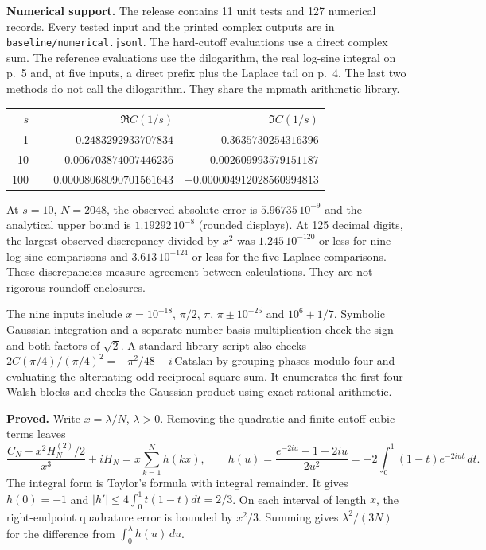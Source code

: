 \newpage
{}
\textbf{Numerical support.} The release contains 11 unit tests and 127 numerical records. Every tested input and the printed complex outputs are in \texttt{baseline/numerical.jsonl}. The hard-cutoff evaluations use a direct complex sum. The reference evaluations use the dilogarithm, the real log-sine integral on p.~5 and, at five inputs, a direct prefix plus the Laplace tail on p.~4. The last two methods do not call the dilogarithm. They share the mpmath arithmetic library.

\begin{center}
\begin{tabular}{@{}r@{\qquad}r@{\qquad}r@{}}
$s$ & $\Re C(1/s)$ & $\Im C(1/s)$\\ \hline
1   & $-0.2483292933707834$ & $-0.3635730254316396$\\
10  & $\phantom{-}0.006703874007446236$ & $-0.002609993579151187$\\
100 & $\phantom{-}0.00008068090701561643$ & $-0.000004912028560994813$
\end{tabular}
\end{center}
At $s=10$, $N=2048$, the observed absolute error is $5.96735\,10^{-9}$ and the analytical upper bound is $1.19292\,10^{-8}$ (rounded displays). At 125 decimal digits, the largest observed discrepancy divided by $x^2$ was $1.245\,10^{-120}$ or less for nine log-sine comparisons and $3.613\,10^{-124}$ or less for the five Laplace comparisons. These discrepancies measure agreement between calculations. They are not rigorous roundoff enclosures.

The nine inputs include $x=10^{-18}$, $\pi/2$, $\pi$, $\pi\pm10^{-25}$ and $10^6+1/7$. Symbolic Gaussian integration and a separate number-basis multiplication check the sign and both factors of $\sqrt{2}$. A standard-library script also checks $2C(\pi/4)/(\pi/4)^2=-\pi^2/48-i\,\mathrm{Catalan}$ by grouping phases modulo four and evaluating the alternating odd reciprocal-square sum. It enumerates the first four Walsh blocks and checks the Gaussian product using exact rational arithmetic.

\textbf{Proved.} Write $x=\lambda/N$, $\lambda>0$. Removing the quadratic and finite-cutoff cubic terms leaves
\[
 \frac{C_N-x^2H_N^{(2)}/2}{x^3}+iH_N
   =x\sum_{k=1}^N h(kx),\qquad
 h(u)=\frac{e^{-2iu}-1+2iu}{2u^2}
     =-2\int_0^1(1-t)e^{-2iut}\,dt .
\]
The integral form is Taylor's formula with integral remainder. It gives $h(0)=-1$ and $|h'|\le4\int_0^1t(1-t)dt=2/3$. On each interval of length $x$, the right-endpoint quadrature error is bounded by $x^2/3$. Summing gives $\lambda^2/(3N)$ for the difference from $\int_0^\lambda h(u)\,du$.

